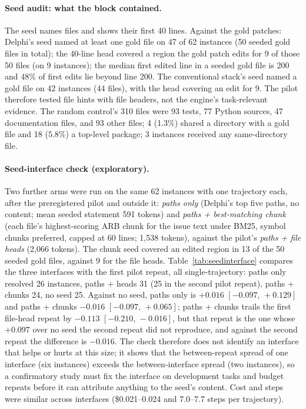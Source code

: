 \documentclass{article}
\newcommand{\ci}[2]{{\footnotesize$[#1,\,#2]$}}
\newcommand{\system}{Delphi}
\begin{document}
\paragraph{Seed audit: what the block contained.} The seed names files and shows their first 40 lines. Against the gold patches: \system{}'s seed named at least one gold file on 47 of 62 instances (50 seeded gold files in total); the 40-line head covered a region the gold patch edits for 9 of those 50 files (on 9 instances); the median first edited line in a seeded gold file is 200 and $48\%$ of first edits lie beyond line 200. The conventional stack's seed named a gold file on 42 instances (44 files), with the head covering an edit for 9. The pilot therefore tested file hints with file headers, not the engine's task-relevant evidence. The random control's 310 files were 93 tests, 77 Python sources, 47 documentation files, and 93 other files; 4 (1.3\%) shared a directory with a gold file and 18 (5.8\%) a top-level package; 3 instances received any same-directory file.

\paragraph{Seed-interface check (exploratory).} Two further arms were run on the same 62 instances with one trajectory each, after the preregistered pilot and outside it: \emph{paths only} (\system{}'s top five paths, no content; mean seeded statement 591 tokens) and \emph{paths + best-matching chunk} (each file's highest-scoring ARB chunk for the issue text under BM25, symbol chunks preferred, capped at 60 lines; 1{,}538 tokens), against the pilot's \emph{paths + file heads} (2{,}066 tokens). The chunk seed covered an edited region in 13 of the 50 seeded gold files, against 9 for the file heads. Table~\ref{tab:seedinterface} compares the three interfaces with the first pilot repeat, all single-trajectory: paths only resolved 26 instances, paths + heads 31 (25 in the second pilot repeat), paths + chunks 24, no seed 25. Against no seed, paths only is $+0.016$ \ci{-0.097}{+0.129} and paths + chunks $-0.016$ \ci{-0.097}{+0.065}; paths + chunks trails the first file-head repeat by $-0.113$ \ci{-0.210}{-0.016}, but that repeat is the one whose $+0.097$ over no seed the second repeat did not reproduce, and against the second repeat the difference is $-0.016$. The check therefore does not identify an interface that helps or hurts at this size; it shows that the between-repeat spread of one interface (six instances) exceeds the between-interface spread (two instances), so a confirmatory study must fix the interface on development tasks and budget repeats before it can attribute anything to the seed's content. Cost and steps were similar across interfaces (\$0.021--0.024 and 7.0--7.7 steps per trajectory).
\end{document}
